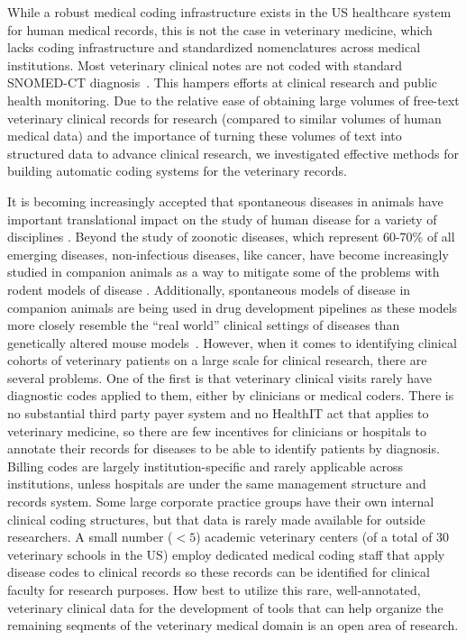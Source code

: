 \documentclass{article}[11pt,oneside]
\begin{document}
While a robust medical coding infrastructure exists in the US healthcare system for human medical records, this is not the case in veterinary medicine, which 
 lacks coding infrastructure and standardized nomenclatures across medical institutions. Most veterinary clinical notes are not coded with standard SNOMED-CT diagnosis~\cite{o2014approaches}. 
This hampers efforts at clinical research and public health monitoring. Due to the relative ease of obtaining large volumes of free-text veterinary clinical records for research (compared to similar volumes of human medical data) and the importance of turning these volumes of text into structured data to advance clinical research, we investigated effective methods for building automatic coding systems for the veterinary records. 

It is becoming increasingly accepted that spontaneous diseases in animals have important translational impact on the study of human disease for a variety of disciplines \cite{kol2015companion}. Beyond the study of zoonotic diseases, which represent 60-70\% of all emerging diseases, non-infectious diseases, like cancer, have become increasingly studied in companion animals as a way to mitigate some of the problems with rodent models of disease \cite{leblanc2016defining}. Additionally, spontaneous models of disease in companion animals are being used in drug development pipelines as these models more closely resemble the ``real world'' clinical settings of diseases than genetically altered mouse models~\cite{grimm2016bark,klinck2017translational,baraban2014new,hernandez2018naturally}. 
However, when it comes to identifying clinical cohorts of veterinary patients on a large scale for clinical research, there are several problems.  One of the first is that veterinary clinical visits rarely have diagnostic codes applied to them, either by clinicians or medical coders.  There is no substantial third party payer system and no HealthIT act that applies to veterinary medicine, so there are few incentives for clinicians or hospitals to annotate their records for diseases to be able to identify patients by diagnosis.  Billing codes are largely institution-specific and rarely applicable across institutions, unless hospitals are under the same management structure and records system. Some large corporate practice groups have their own internal clinical coding structures, but that data is rarely made available for outside researchers. A small number ($< 5$) academic veterinary centers (of a total of 30 veterinary schools in the US) employ dedicated medical coding staff that apply disease codes to clinical records so these records can be identified for clinical faculty for research purposes. How best to utilize this rare, well-annotated, veterinary clinical data for the development of tools that can help organize the remaining seqments of the veterinary medical domain is an open area of  research. 
\end{document}
